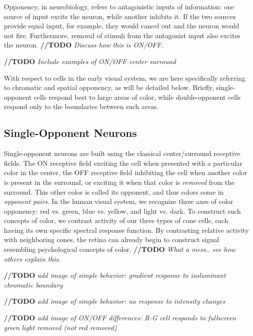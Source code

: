 \documentclass[journal,onecolumn]{IEEEtran}
\begin{document}
Opponency, in neurobiology, refers to antagonistic inputs of information: one source of input excits the neuron, while another inhibits it. If the two sources provide equal input, for example, they would cancel out and the neuron would not fire. 
Furthermore, removal of stimuli from the antagonist input also excites the neuron. \textbf{//TODO} \textit{Discuss how this is ON/OFF.}

\textbf{//TODO} \textit{Include examples of ON/OFF center surround}

With respect to cells in the early visual system, we are here specifically referring to chromatic and spatial opponency, as will be detailed below. Briefly, single-opponent cells respond best to large areas of color, while double-opponent cells respond only to the boundaries between such areas.


\subsection*{Single-Opponent Neurons}

Single-opponent neurons are built using the classical center/surround receptive fields. The ON receptive field exciting the cell when presented with a particular color in the center, the OFF receptive field inhibiting the cell when another color is present in the surround, or exciting it when that color is \textit{removed} from the surround. This other color is called its opponent, and thus colors come in \textit{opponent pairs}. In the human visual system, we recognize three axes of color opponency: red vs. green, blue vs. yellow, and light vs. dark. To construct such concepts of color, we contrast activity of our three types of cone cells, each having its own specific spectral response function. By contrasting relative activity with neighboring cones, the retina can already begin to construct signal resembling psychological concepts of color. \textbf{//TODO} \textit{What a mess.. see how others explain this.}

\textbf{//TODO} \textit{add image of simple behavior: gradient response to isoluminant chromatic boundary}

\textbf{//TODO} \textit{add image of simple behavior: no response to intensity changes}

\textbf{//TODO} \textit{add image of ON/OFF differences: R-G cell responds to fullscreen green light removed (not red removed)}
\end{document}
